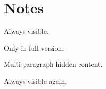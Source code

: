 \hypertarget{notes}{%
\section{Notes}\label{notes}}

Always visible.

Only in full version.

Multi-paragraph hidden content.

Always visible again.
